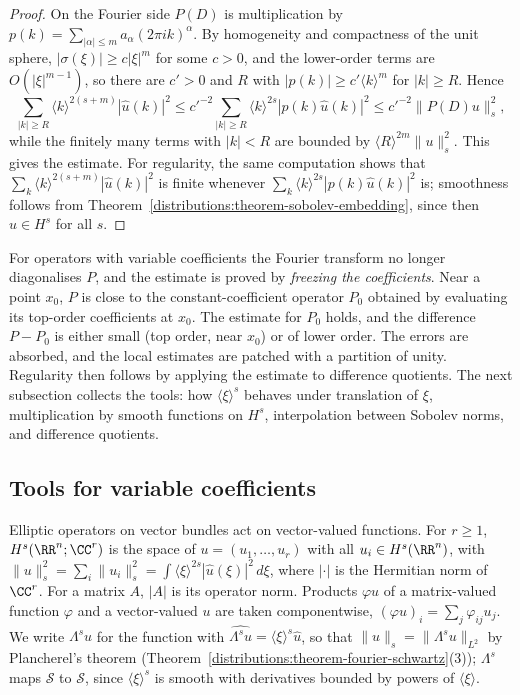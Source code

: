 \begin{proof}
On the Fourier side $P(D)$ is multiplication by $p(k) = \sum_{|\alpha| \leq m}a_\alpha(2\pi ik)^\alpha$. By homogeneity and compactness of the unit sphere, $|\sigma(\xi)| \geq c|\xi|^m$ for some $c > 0$, and the
lower-order terms are $O(|\xi|^{m-1})$, so there are $c' > 0$ and $R$ with $|p(k)| \geq c'\langle k\rangle^m$ for $|k| \geq R$. Hence
\[
\sum_{|k| \geq R}\langle k\rangle^{2(s+m)}|\hat u(k)|^2 \leq c'^{-2}\sum_{|k| \geq R}\langle k\rangle^{2s}|p(k)\hat u(k)|^2 \leq c'^{-2}\|P(D)u\|_s^2,
\]
while the finitely many terms with $|k| < R$ are bounded by $\langle R\rangle^{2m}\|u\|_s^2$. This gives the estimate. For regularity, the same computation shows that
$\sum_k\langle k\rangle^{2(s+m)}|\hat u(k)|^2$ is finite whenever $\sum_k\langle k\rangle^{2s}|p(k)\hat u(k)|^2$ is; smoothness follows from
Theorem~\ref{distributions:theorem-sobolev-embedding}, since then $u \in H^s$ for all $s$.
\end{proof}

For operators with variable coefficients the Fourier transform no longer diagonalises $P$, and the estimate is proved by \emph{freezing the coefficients}. Near a point $x_0$, $P$ is close to the
constant-coefficient operator $P_0$ obtained by evaluating its top-order coefficients at $x_0$. The estimate for $P_0$ holds, and the difference $P - P_0$ is either small (top order, near $x_0$) or of
lower order. The errors are absorbed, and the local estimates are patched with a partition of unity. Regularity then follows by applying the estimate to difference quotients. The next subsection
collects the tools: how $\langle\xi\rangle^s$ behaves under translation of $\xi$, multiplication by smooth functions on $H^s$, interpolation between Sobolev norms, and difference quotients.

\subsection{Tools for variable coefficients}\label{distributions:subsection-tools}

\begin{notation}\label{distributions:notation-vector-valued}
Elliptic operators on vector bundles act on vector-valued functions. For $r \geq 1$, $H^s(\RR^n; \CC^r)$ is the space of $u = (u_1, \ldots, u_r)$ with all $u_i \in H^s(\RR^n)$, with
$\|u\|_s^2 = \sum_i\|u_i\|_s^2 = \int\langle\xi\rangle^{2s}|\hat u(\xi)|^2\,d\xi$, where $|\cdot|$ is the Hermitian norm of $\CC^r$. For a matrix $A$, $|A|$ is its operator norm. Products $\varphi u$ of a
matrix-valued function $\varphi$ and a vector-valued $u$ are taken componentwise, $(\varphi u)_i = \sum_j\varphi_{ij}u_j$. We write $\Lambda^su$ for the function with $\widehat{\Lambda^su} = \langle\xi\rangle^s\hat u$, so that
$\|u\|_s = \|\Lambda^su\|_{L^2}$ by Plancherel's theorem (Theorem~\ref{distributions:theorem-fourier-schwartz}(3)); $\Lambda^s$ maps $\mathcal{S}$ to $\mathcal{S}$, since $\langle\xi\rangle^s$ is smooth with derivatives bounded by powers of $\langle\xi\rangle$.
\end{notation}


